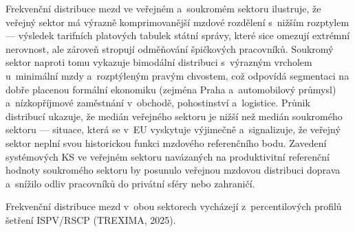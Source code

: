 Frekvenční distribuce mezd ve veřejném a~soukromém sektoru ilustruje, že veřejný sektor má výrazně komprimovanější mzdové rozdělení s~nižším rozptylem --- výsledek tarifních platových tabulek státní správy, které sice omezují extrémní nerovnost, ale zároveň stropují odměňování špičkových pracovníků.
Soukromý sektor naproti tomu vykazuje bimodální distribuci s~výrazným vrcholem u~minimální mzdy a~rozptýleným pravým chvostem, což odpovídá segmentaci na dobře placenou formální ekonomiku (zejména Praha a~automobilový průmysl) a~nízkopříjmové zaměstnání v~obchodě, pohostinství a~logistice.
Průnik distribucí ukazuje, že medián veřejného sektoru je nižší než medián soukromého sektoru --- situace, která se v~\ac{EU} vyskytuje výjimečně a~signalizuje, že veřejný sektor neplní svou historickou funkci mzdového referenčního bodu.
Zavedení systémových \ac{KS} ve veřejném sektoru navázaných na produktivitní referenční hodnoty soukromého sektoru by posunulo veřejnou mzdovou distribuci doprava a~snížilo odliv pracovníků do privátní sféry nebo zahraničí.

Frekvenční distribuce mezd v~obou sektorech vycházejí z~percentilových profilů šetření \acs{ISPV}/RSCP (TREXIMA, 2025).\par


